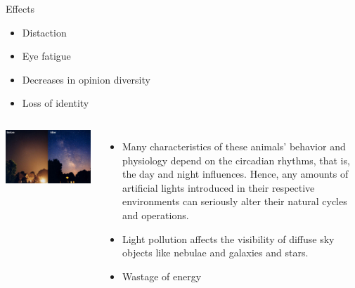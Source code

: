 \documentclass{beamer}
\begin{document}
     \begin{frame}{Effects}
         \begin{itemize}
             \item Distaction
             \item Eye fatigue
             \item Decreases in opinion diversity
             \item Loss of identity
         \end{itemize}
     \end{frame}
     \begin{frame}
        \begin{columns}
                \includegraphics[height=.99\textwidth,width=.99\textwidth]{img/coreglow.jpg}
            \begin{itemize}
                \item Many characteristics of these animals’ behavior and physiology depend on 
                the circadian rhythms, that is, the day and night influences. Hence, any amounts of 
                artificial lights introduced in their respective environments can seriously alter 
                their natural cycles and operations. 
                \item Light pollution affects the visibility of diffuse sky objects like nebulae and 
                galaxies and stars. 
                \item Wastage of energy
            \end{itemize}
        \end{columns}
     \end{frame}
\end{document}
